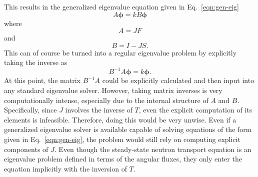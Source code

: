 This results in the generalized eigenvalue equation given in Eq.~\ref{eqn:gen-eig}
\begin{equation}
A \boldsymbol{\phi} = k B \boldsymbol{\phi}
\label{eqn:gen-eig}
\end{equation}
where
\begin{equation}
A = JF
\end{equation}
and
\begin{equation}
B = I - JS.
\end{equation}
This can of course be turned into a regular eigenvalue problem by explicitly taking the inverse as
\begin{equation}
B^{-1}A \boldsymbol{\phi} = k \boldsymbol{\phi}.
\label{eqn:eig}
\end{equation}
At this point, the matrix $B^{-1}A$ could be explicitly calculated and then input into any standard eigenvalue solver. However, taking matrix inverses is very computationally intense, especially due to the internal structure of $A$ and $B$. Specifically, since $J$ involves the inverse of $T$, even the explicit computation of its elements is infeasible. Therefore, doing this would be very unwise. Even if a generalized eigenvalue solver is available capable of solving equations of the form given in Eq.~\ref{eqn:gen-eig}, the problem would still rely on computing explicit components of $J$. Even though the steady-state neutron transport equation is an eigenvalue problem defined in terms of the angular fluxes, they only enter the equation implicitly with the inversion of $T$. 


